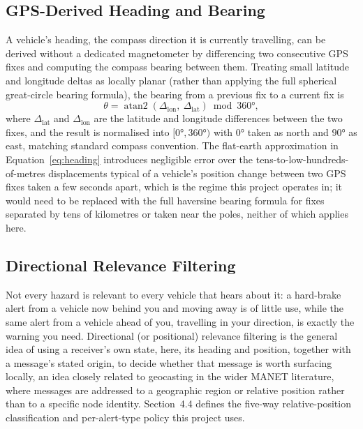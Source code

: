 \documentclass[12pt,a4paper]{report}
\begin{document}
\subsection{GPS-Derived Heading and Bearing}
A vehicle's heading, the compass direction it is currently travelling, can be derived without a dedicated magnetometer by differencing two consecutive GPS fixes and computing the compass bearing between them. Treating small latitude and longitude deltas as locally planar (rather than applying the full spherical great-circle bearing formula), the bearing from a previous fix to a current fix is
\begin{equation}
\theta = \operatorname{atan2}(\Delta_{\text{lon}},\ \Delta_{\text{lat}}) \bmod 360°,
\label{eq:heading}
\end{equation}
where $\Delta_{\text{lat}}$ and $\Delta_{\text{lon}}$ are the latitude and longitude differences between the two fixes, and the result is normalised into $[0°,360°)$ with $0°$ taken as north and $90°$ as east, matching standard compass convention. The flat-earth approximation in Equation~\ref{eq:heading} introduces negligible error over the tens-to-low-hundreds-of-metres displacements typical of a vehicle's position change between two GPS fixes taken a few seconds apart, which is the regime this project operates in; it would need to be replaced with the full haversine bearing formula for fixes separated by tens of kilometres or taken near the poles, neither of which applies here.

\subsection{Directional Relevance Filtering}
Not every hazard is relevant to every vehicle that hears about it: a hard-brake alert from a vehicle now behind you and moving away is of little use, while the same alert from a vehicle ahead of you, travelling in your direction, is exactly the warning you need. Directional (or positional) relevance filtering is the general idea of using a receiver's own state, here, its heading and position, together with a message's stated origin, to decide whether that message is worth surfacing locally, an idea closely related to geocasting in the wider MANET literature, where messages are addressed to a geographic region or relative position rather than to a specific node identity. Section~4.4 defines the five-way relative-position classification and per-alert-type policy this project uses.
\end{document}
